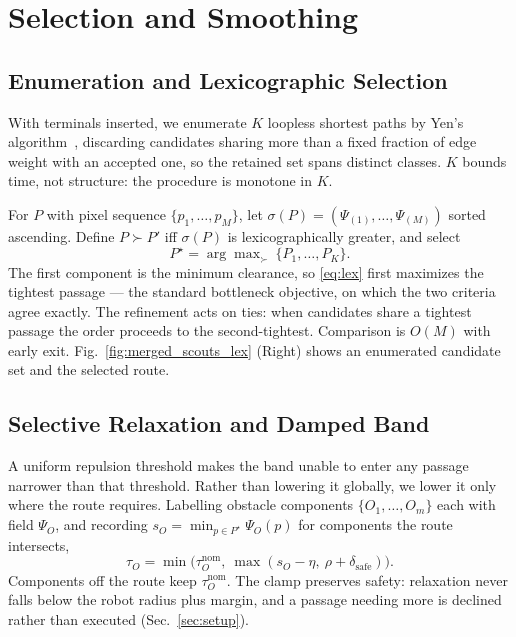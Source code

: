 \documentclass[conference]{IEEEtran}
\begin{document}
\section{Selection and Smoothing}
\label{sec:opt}

\subsection{Enumeration and Lexicographic Selection}

With terminals inserted, we enumerate $K$ loopless shortest paths by Yen's algorithm~\cite{yen1971}, discarding candidates sharing more than a fixed fraction of edge weight with an accepted one, so the retained set spans distinct classes. $K$ bounds time, not structure: the procedure is monotone in $K$.

For $P$ with pixel sequence $\{p_1,\dots,p_M\}$, let $\sigma(P)=(\Psi_{(1)},\dots,\Psi_{(M)})$ sorted ascending. Define $P\succ P'$ iff $\sigma(P)$ is lexicographically greater, and select
\begin{equation}
P^\star=\arg\max\nolimits_{\succ}\ \{P_1,\dots,P_K\} .
\label{eq:lex}
\end{equation}
The first component is the minimum clearance, so \eqref{eq:lex} first maximizes the tightest passage --- the standard bottleneck objective, on which the two criteria agree exactly. The refinement acts on ties: when candidates share a tightest passage the order proceeds to the second-tightest.  Comparison is $O(M)$ with early exit. Fig.~\ref{fig:merged_scouts_lex} (Right) shows an enumerated candidate set and the selected route.



\subsection{Selective Relaxation and Damped Band}

A uniform repulsion threshold makes the band unable to enter any passage narrower than that threshold. Rather than lowering it globally, we lower it only where the route requires. Labelling obstacle components $\{O_1,\dots,O_m\}$ each with field $\Psi_O$, and recording $s_O=\min_{p\in P^\star}\Psi_O(p)$ for components the route intersects,
\begin{equation}
\tau_O=\min\big(\tau_O^{\mathrm{nom}},\ \max(s_O-\eta,\ \rho+\delta_{\mathrm{safe}})\big).
\label{eq:relax}
\end{equation}
Components off the route keep $\tau_O^{\mathrm{nom}}$. The clamp preserves safety: relaxation never falls below the robot radius plus margin, and a passage needing more is declined rather than executed (Sec.~\ref{sec:setup}).
\end{document}
